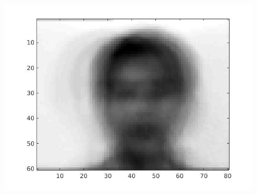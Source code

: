 \documentclass{article}
\begin{document}
\begin{figure}[H]


\includegraphics[scale =.5]{report6_1}
\end{figure}
\end{document}

